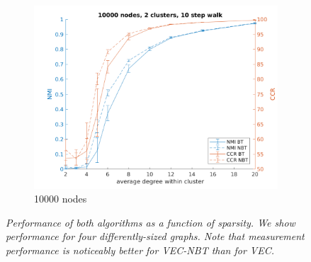 \documentclass{article} %
\begin{document}
\begin{figure}[H]
\begin{subfigure}{0.48\textwidth}
        \includegraphics[width=\linewidth]{fig1/N10000K2len10}
        \caption{10000 nodes}
        \label{fig:subim14}
    \end{subfigure}
    \caption{\emph{Performance of both algorithms as a function of sparsity. We show performance for four differently-sized graphs. Note that measurement performance is noticeably better for VEC-NBT than for VEC.}}
    \label{fig:image1}
\end{figure}
\end{document}
